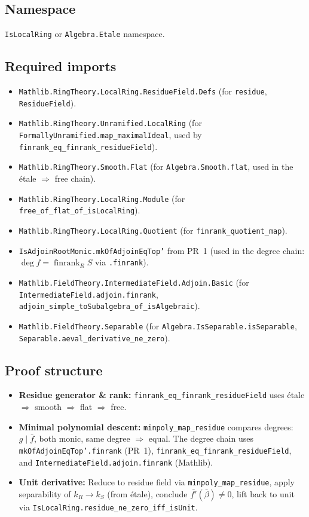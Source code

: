 \subsection*{Namespace}

\texttt{IsLocalRing} or \texttt{Algebra.Etale} namespace.

\subsection*{Required imports}
\begin{itemize}
  \item \texttt{Mathlib.RingTheory.LocalRing.ResidueField.Defs}
    (for \texttt{residue}, \texttt{ResidueField}).
  \item \texttt{Mathlib.RingTheory.Unramified.LocalRing}
    (for \texttt{FormallyUnramified.}\allowbreak\texttt{map\_maximalIdeal},
     used by \texttt{finrank\_eq\_finrank\_residueField}).
  \item \texttt{Mathlib.RingTheory.Smooth.Flat}
    (for \texttt{Algebra.Smooth.flat}, used in the étale $\Rightarrow$ free chain).
  \item \texttt{Mathlib.RingTheory.LocalRing.Module}
    (for \texttt{free\_of\_flat\_of\_isLocalRing}).
  \item \texttt{Mathlib.RingTheory.LocalRing.Quotient}
    (for \texttt{finrank\_quotient\_map}).
  \item \texttt{IsAdjoinRootMonic.mkOfAdjoinEqTop'} from PR~1
    (used in the degree chain: $\deg f = \operatorname{finrank}_R S$
     via \texttt{.finrank}).
  \item \texttt{Mathlib.FieldTheory.IntermediateField.Adjoin.Basic}
    (for \texttt{IntermediateField.adjoin.finrank},
     \texttt{adjoin\_simple\_toSubalgebra\_}\allowbreak\texttt{of\_isAlgebraic}).
  \item \texttt{Mathlib.FieldTheory.Separable}
    (for \texttt{Algebra.IsSeparable.isSeparable},
     \texttt{Separable.aeval\_derivative\_ne\_zero}).
\end{itemize}

\subsection*{Proof structure}
\begin{itemize}
  \item \textbf{Residue generator \& rank:} \texttt{finrank\_eq\_finrank\_residueField} uses étale $\Rightarrow$ smooth $\Rightarrow$ flat $\Rightarrow$ free.
  \item \textbf{Minimal polynomial descent:} \texttt{minpoly\_map\_residue} compares degrees:
    $g \mid \bar f$, both monic, same degree $\Rightarrow$ equal.
    The degree chain uses \texttt{mkOfAdjoinEqTop'.finrank} (PR~1),
    \texttt{finrank\_eq\_finrank\_residueField}, and
    \texttt{IntermediateField.adjoin.finrank} (Mathlib).
  \item \textbf{Unit derivative:} Reduce to residue field via \texttt{minpoly\_map\_residue},
    apply separability of $k_R \to k_S$ (from étale), conclude
    $\bar{f'}(\bar\beta) \ne 0$, lift back to unit via
    \texttt{IsLocalRing.residue\_ne\_zero\_iff\_isUnit}.
\end{itemize}

